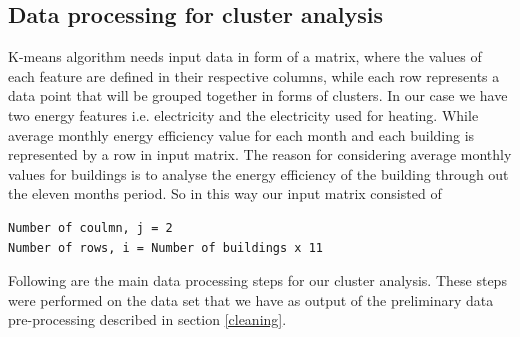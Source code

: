 \subsection{Data processing for cluster analysis}
K-means algorithm needs input data in form of a matrix, where the values of each feature are defined in their respective columns, while each row represents a data point that will be grouped together in forms of clusters. In our case we have two energy features i.e. electricity and the electricity used for heating. While average monthly energy efficiency value for each month and each building is represented by a row in input matrix. The reason for considering average monthly values for buildings is to analyse the energy efficiency of the building through out the eleven months period. So in this way our input matrix consisted of 
\begin{lstlisting}
Number of coulmn, j = 2
Number of rows, i = Number of buildings x 11 
\end{lstlisting}
Following are the main data processing steps for our cluster analysis. These steps were performed on the data set that we have as output of the preliminary data pre-processing described in section \ref{cleaning}.
